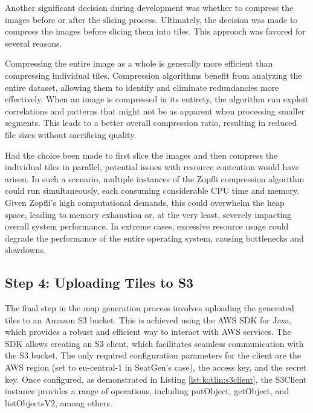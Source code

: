Another significant decision during development was whether to compress the images before or after the slicing process. Ultimately, the decision was made to compress the images before slicing them into tiles. This approach was favored for several reasons.

Compressing the entire image as a whole is generally more efficient than compressing individual tiles. Compression algorithms benefit from analyzing the entire dataset, allowing them to identify and eliminate redundancies more effectively. When an image is compressed in its entirety, the algorithm can exploit correlations and patterns that might not be as apparent when processing smaller segments. This leads to a better overall compression ratio, resulting in reduced file sizes without sacrificing quality.

Had the choice been made to first slice the images and then compress the individual tiles in parallel, potential issues with resource contention would have arisen. In such a scenario, multiple instances of the Zopfli compression algorithm could run simultaneously, each consuming considerable CPU time and memory. Given Zopfli’s high computational demands, this could overwhelm the heap space, leading to memory exhaustion or, at the very least, severely impacting overall system performance. In extreme cases, excessive resource usage could degrade the performance of the entire operating system, causing bottlenecks and slowdowns.

\subsection{Step 4: Uploading Tiles to S3}

The final step in the map generation process involves uploading the generated tiles to an Amazon S3 bucket. This is achieved using the AWS SDK for Java, which provides a robust and efficient way to interact with AWS services. The SDK allows creating an S3 client, which facilitates seamless communication with the S3 bucket. The only required configuration parameters for the client are the AWS region (set to eu-central-1 in SeatGen's case), the access key, and the secret key. Once configured, as demonstrated in Listing \ref{lst:kotlin:s3client}, the S3Client instance provides a range of operations, including putObject, getObject, and listObjectsV2, among others.

